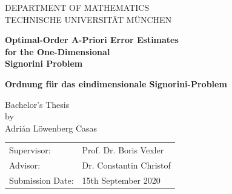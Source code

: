 \documentclass[headsepline,footsepline,footinclude=false,oneside,fontsize=11pt,paper=a4,listof=totoc,bibliography=totoc]{scrbook} %
\begin{document}
\pagestyle{empty}       %
\parbox{1.5cm}{}\hspace{310pt}%
\parbox{1.5cm}{}%
\vspace*{1.5cm}
\begin{center}
	{\huge \MakeUppercase{Department of Mathematics}} 
	\\
	\vspace*{5mm}
	{\large \MakeUppercase{Technische Universität München} }
	\\
	\vspace*{1cm}
	{\huge {\textbf{{Optimal-Order A-Priori Error Estimates} \\ for the
				One-Dimensional\\ Signorini Problem}\par}}
	{\huge {\textbf{  Ordnung für das eindimensionale Signorini-Problem}\par}}
	\vspace*{1cm}
	{\Large Bachelor's Thesis}\linebreak \\ 
	{\Large by}\linebreak \\
	{\Large Adrián Löwenberg Casas}\\
	\vspace*{0.8cm}
	{\large 
		\begin{tabular}{ll}
			Supervisor: & Prof. Dr. Boris Vexler\\
			Advisor: & Dr. Constantin Christof\\
			Submission Date: & 15th September 2020
		\end{tabular}
	}
\end{center}
\newpage    %
\end{document}
